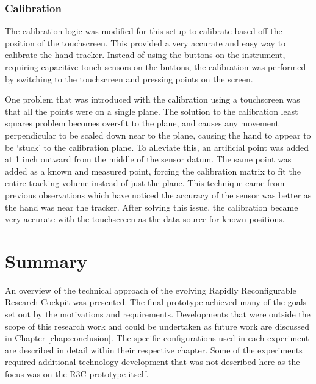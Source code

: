 \subsubsection{Calibration}

The calibration logic was modified for this setup to calibrate based off the position of the touchscreen.
This provided a very accurate and easy way to calibrate the hand tracker.
Instead of using the buttons on the instrument, requiring capacitive touch sensors on the buttons, the calibration was performed by switching to the touchscreen and pressing points on the screen.

One problem that was introduced with the calibration using a touchscreen was that all the points were on a single plane.
The solution to the calibration least squares problem becomes over-fit to the plane, and causes any movement perpendicular to be scaled down near to the plane, causing the hand to appear to be `stuck' to the calibration plane.
To alleviate this, an artificial point was added at 1 inch outward from the middle of the sensor datum.
The same point was added as a known and measured point, forcing the calibration matrix to fit the entire tracking volume instead of just the plane.
This technique came from previous observations which have noticed the accuracy of the sensor was better as the hand was near the tracker.
After solving this issue, the calibration became very accurate with the touchscreen as the data source for known positions.

\section{Summary}

An overview of the technical approach of the evolving Rapidly Reconfigurable Research Cockpit was presented.
The final prototype achieved many of the goals set out by the motivations and requirements.
Developments that were outside the scope of this research work and could be undertaken as future work are discussed in Chapter \ref{chap:conclusion}.
The specific configurations used in each experiment are described in detail within their respective chapter.
Some of the experiments required additional technology development that was not described here as the focus was on the R3C prototype itself.
